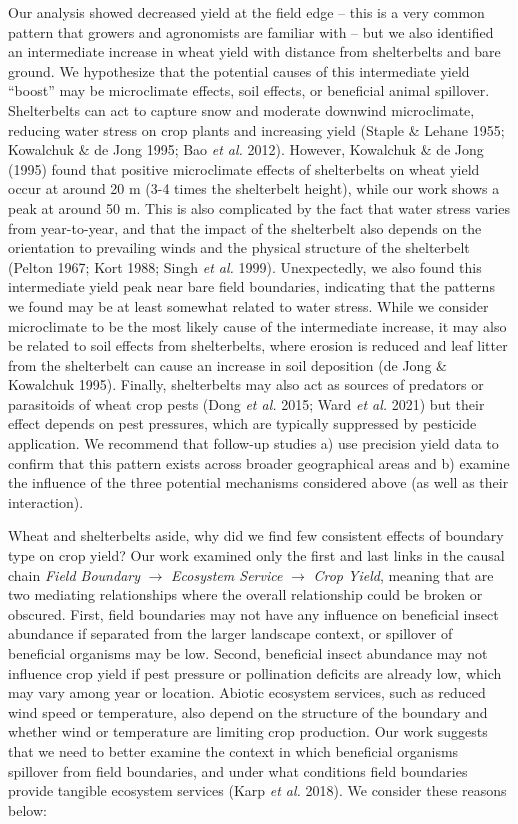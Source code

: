 \documentclass[]{elsarticle} %
\begin{document}
Our analysis showed decreased yield at the field edge -- this is a very common pattern that growers and agronomists are familiar with -- but we also identified an intermediate increase in wheat yield with distance from shelterbelts and bare ground.
We hypothesize that the potential causes of this intermediate yield ``boost'' may be microclimate effects, soil effects, or beneficial animal spillover.
Shelterbelts can act to capture snow and moderate downwind microclimate, reducing water stress on crop plants and increasing yield (Staple \& Lehane 1955; Kowalchuk \& de Jong 1995; Bao \emph{et al.} 2012).
However, Kowalchuk \& de Jong (1995) found that positive microclimate effects of shelterbelts on wheat yield occur at around 20 m (3-4 times the shelterbelt height), while our work shows a peak at around 50 m.
This is also complicated by the fact that water stress varies from year-to-year, and that the impact of the shelterbelt also depends on the orientation to prevailing winds and the physical structure of the shelterbelt (Pelton 1967; Kort 1988; Singh \emph{et al.} 1999).
Unexpectedly, we also found this intermediate yield peak near bare field boundaries, indicating that the patterns we found may be at least somewhat related to water stress.
While we consider microclimate to be the most likely cause of the intermediate increase, it may also be related to soil effects from shelterbelts, where erosion is reduced and leaf litter from the shelterbelt can cause an increase in soil deposition (de Jong \& Kowalchuk 1995).
Finally, shelterbelts may also act as sources of predators or parasitoids of wheat crop pests (Dong \emph{et al.} 2015; Ward \emph{et al.} 2021) but their effect depends on pest pressures, which are typically suppressed by pesticide application.
We recommend that follow-up studies a) use precision yield data to confirm that this pattern exists across broader geographical areas and b) examine the influence of the three potential mechanisms considered above (as well as their interaction).

Wheat and shelterbelts aside, why did we find few consistent effects of boundary type on crop yield?
Our work examined only the first and last links in the causal chain \emph{Field Boundary} \(\rightarrow\) \emph{Ecosystem Service} \(\rightarrow\) \emph{Crop Yield}, meaning that are two mediating relationships where the overall relationship could be broken or obscured.
First, field boundaries may not have any influence on beneficial insect abundance if separated from the larger landscape context, or spillover of beneficial organisms may be low.
Second, beneficial insect abundance may not influence crop yield if pest pressure or pollination deficits are already low, which may vary among year or location.
Abiotic ecosystem services, such as reduced wind speed or temperature, also depend on the structure of the boundary and whether wind or temperature are limiting crop production.
Our work suggests that we need to better examine the context in which beneficial organisms spillover from field boundaries, and under what conditions field boundaries provide tangible ecosystem services (Karp \emph{et al.} 2018).
We consider these reasons below:
\end{document}
